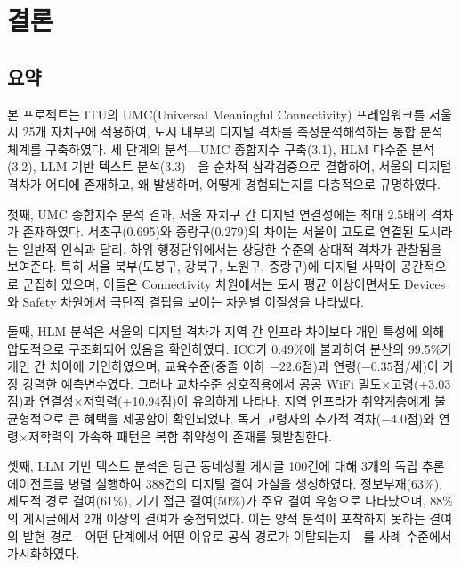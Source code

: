 \section{결론}
\label{sec:conclusion}


\subsection{요약}
\label{subsec:5-1}

본 프로젝트는 ITU의 UMC(Universal Meaningful Connectivity) 프레임워크를 서울시 25개 자치구에 적용하여, 도시 내부의 디지털 격차를 측정\textperiodcentered{}분석\textperiodcentered{}해석하는 통합 분석 체계를 구축하였다. 세 단계의 분석---UMC 종합지수 구축(3.1), HLM 다수준 분석(3.2), LLM 기반 텍스트 분석(3.3)---을 순차적 삼각검증으로 결합하여, 서울의 디지털 격차가 어디에 존재하고, 왜 발생하며, 어떻게 경험되는지를 다층적으로 규명하였다.

첫째, UMC 종합지수 분석 결과, 서울 자치구 간 디지털 연결성에는 최대 2.5배의 격차가 존재하였다. 서초구(0.695)와 중랑구(0.279)의 차이는 서울이 고도로 연결된 도시라는 일반적 인식과 달리, 하위 행정단위에서는 상당한 수준의 상대적 격차가 관찰됨을 보여준다. 특히 서울 북부(도봉구, 강북구, 노원구, 중랑구)에 디지털 사막이 공간적으로 군집해 있으며, 이들은 Connectivity 차원에서는 도시 평균 이상이면서도 Devices와 Safety 차원에서 극단적 결핍을 보이는 차원별 이질성을 나타냈다.

둘째, HLM 분석은 서울의 디지털 격차가 지역 간 인프라 차이보다 개인 특성에 의해 압도적으로 구조화되어 있음을 확인하였다. ICC가 0.49\%에 불과하여 분산의 99.5\%가 개인 간 차이에 기인하였으며, 교육수준(중졸 이하 $-22.6$점)과 연령($-0.35$점/세)이 가장 강력한 예측변수였다. 그러나 교차수준 상호작용에서 공공 WiFi 밀도$\times$고령(+3.03점)과 연결성$\times$저학력(+10.94점)이 유의하게 나타나, 지역 인프라가 취약계층에게 불균형적으로 큰 혜택을 제공함이 확인되었다. 독거 고령자의 추가적 격차($-4.0$점)와 연령$\times$저학력의 가속화 패턴은 복합 취약성의 존재를 뒷받침한다.

셋째, LLM 기반 텍스트 분석은 당근 동네생활 게시글 100건에 대해 3개의 독립 추론 에이전트를 병렬 실행하여 388건의 디지털 결여 가설을 생성하였다. 정보부재(63\%), 제도적 경로 결여(61\%), 기기 접근 결여(50\%)가 주요 결여 유형으로 나타났으며, 88\%의 게시글에서 2개 이상의 결여가 중첩되었다. 이는 양적 분석이 포착하지 못하는 결여의 발현 경로---어떤 단계에서 어떤 이유로 공식 경로가 이탈되는지---를 사례 수준에서 가시화하였다.

